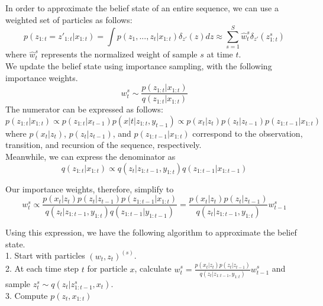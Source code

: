 \documentclass{article}
\begin{document}
In order to approximate the belief state of an entire sequence, we can use a weighted set of particles as follows:  
\[p(z_{1:t}=z'_{1:t}|x_{1:t}) = \int p(z_1,...,z_t|x_{1:t})\delta_{z'}(z)dz \approx \sum_{s=1}^S \hat{w}_t^s \delta_{z'}(z^s_{1:t})\]
where $\hat{w}_t^s$ represents the normalized weight of sample $s$ at time $t$. \\

We update the belief state using importance sampling, with the following importance weights. 
\[w_t^s \sim \frac{p(z_{1:t}|x_{1:t})}{q(z_{1:t}|x_{1:t})}\]
The numerator can be expressed as follows: 
\[p(z_{1:t}|x_{1:t}) \propto p(z_{1:t}|x_{t-1})p(x|t|z_{1:t},y_{t-1}) \propto p(x_t|z_t)p(z_t|z_{t-1})p(z_{1:t-1}|x_{1:t})\]
where $p(x_t|z_t)$, $p(z_t|z_{t-1})$, and $p(z_{1:t-1}|x_{1:t})$ correspond to the observation, transition, and recursion of the sequence, respectively. \\

Meanwhile, we can express the denominator as
\[q(z_{1:t}|x_{1:t}) \propto q(z_t|z_{1:t-1},y_{1:t})q(z_{1:t-1}|x_{1:t-1})\]

Our importance weights, therefore, simplify to
\[w_t^s \propto \frac{p(x_t|z_t)p(z_t|z_{t-1})p(z_{1:t-1}|x_{1:t})}{q(z_t|z_{1:t-1},y_{1:t})q(z_{1:t-1}|y_{1:t-1})} = \frac{p(x_t|z_t)p(z_t|z_{t-1})}{q(z_t|z_{1:t-1},y_{1:t})}w_{t-1}^s\]

Using this expression, we have the following algorithm to approximate the belief state. \\
1. Start with particles $(w_t,z_t)^{(s)}$. \\
2. At each time step $t$ for particle $x$, calculate $w_t^s = \frac{p(x_t|z_t)p(z_t|z_{t-1})}{q(z_t|z_{1:t-1},y_{1:t})}w_{t-1}^s$ and sample $z_t^s \sim q(z_t|z^s_{1:t-1},x_t)$. \\
3. Compute $p(z_t,x_{1:t})$
\end{document}
